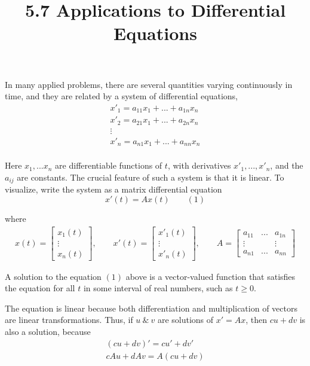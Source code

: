 \documentclass{article}
\title{5.7 Applications to Differential Equations}
\begin{document}
  \maketitle
  In many applied problems, there are several quantities varying continuously in time, and they are related by a system of differential equations,
  \[
    \begin{gathered}
    x'_1=a_{11}x_1+...+a_{1n}x_n\\
    x'_2=a_{21}x_1+...+a_{2n}x_n\\
    \vdots\\
    x'_n=a_{n1}x_1+...+a_{nn}x_n\\
    \end{gathered}
  \]

  Here $ x_1,...x_n $ are differentiable functions of $ t $, with derivatives $ x'_1,...,x'_n $, and the $ a_{ij} $ are constants. The crucial feature of such a system is that it is linear. To visualize, write the system as a matrix differential equation
  \[
    x'(t)=Ax(t) \qquad (1)
  \]

  where
  \[
    \begin{gathered}
    x(t) = \begin{bmatrix}
      x_1(t)\\
      \vdots\\
      x_n(t)
    \end{bmatrix}, \qquad
    x'(t)=\begin{bmatrix}
      x'_1(t)\\
      \vdots\\
      x'_n(t)
    \end{bmatrix}, \qquad
    A=\begin{bmatrix}
      a_{11} &... &a_{1n}\\
      \vdots & &\vdots\\
      a_{n1} &... &a_{nn}
    \end{bmatrix}
    \end{gathered}
  \]
 
  A solution to the equation $ (1) $  above is a vector-valued function that satisfies the equation for all $ t $ in some interval of real numbers, such as $ t \ge 0 $.

  The equation is linear because both differentiation and multiplication of vectors are linear transformations. Thus, if $ u ~\&~ v $ are solutions of $ x'=Ax $, then $ cu+dv $ is also a solution, because
  \[
    \begin{gathered}
      (cu+dv)'=cu'+dv'\\
      cAu+dAv=A(cu+dv)
    \end{gathered}
  \]
\end{document}
